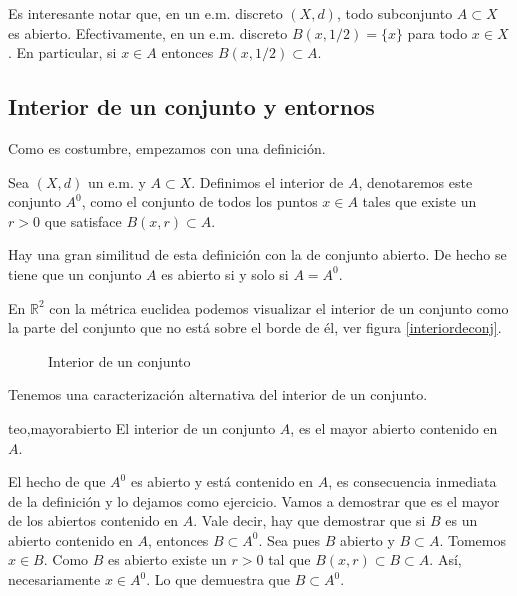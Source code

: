 Es interesante notar que, en un e.m. discreto $(X,d)$, todo
subconjunto $A\subset X$ es abierto. Efectivamente, en un e.m.
discreto $B(x,1/2)=\{x\}$ para todo $x\in X$. En particular, si
$x\in A$ entonces $B(x,1/2)\subset A$.

\subsection{Interior de un conjunto y entornos} Como es costumbre,
empezamos con una definición.
\begin{definicion}{} Sea $(X,d)$ un e.m. y $A\subset X$. Definimos
el interior de $A$, denotaremos este conjunto $A^0$, como el
conjunto de todos los puntos $x\in A$ tales que existe un $r>0$
que satisface $B(x,r)\subset A$.
\end{definicion}

Hay una gran similitud de esta definición con la de conjunto
abierto. De hecho se tiene que un conjunto $A$ es abierto si y
solo si $A=A^0$.

En $\mathbb{R}^2$ con la métrica euclidea podemos visualizar el
interior de un conjunto como la parte del conjunto que no está
sobre el borde de él, ver figura \vref{interiordeconj}.

\begin{figure}
\begin{center}
	\caption{Interior de un conjunto}\label{interiordeconj}
\end{center}
\end{figure}

Tenemos una caracterización alternativa del interior de un
conjunto.

\begin{teorema}{teo,mayorabierto} El interior de un conjunto $A$, es el mayor abierto
contenido en $A$.
\end{teorema}
\begin{demo} El hecho de que $A^0$ es abierto y está contenido
en $A$, es consecuencia inmediata de la definición y lo dejamos
como ejercicio. Vamos a demostrar que es el mayor de los abiertos
contenido en $A$. Vale decir, hay que demostrar que si $B$ es un
abierto contenido en $A$, entonces $B\subset A^0$. Sea pues $B$
abierto y $B\subset A$. Tomemos $x\in B$. Como $B$ es abierto
existe un $r>0$ tal que $B(x,r)\subset B\subset A$. Así,
necesariamente $x\in A^0$. Lo que demuestra que $B\subset A^0$.
\end{demo}

